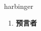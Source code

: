 
\begin{frame}
{\huge harbinger}
\begin{center}
\begin{enumerate}\Large
  \item \textbf{预言者}
\end{enumerate}
\end{center}
\end{frame}
